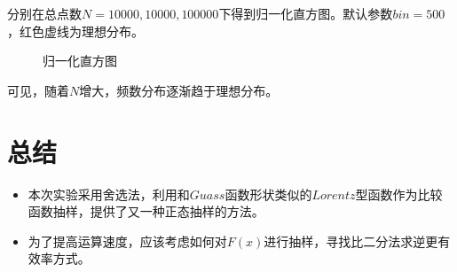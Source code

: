 \documentclass[UTF8]{ctexart}
\begin{document}
	\begin{flushleft}
		
	分别在总点数$N=10000,10000,100000$下得到归一化直方图。默认参数$bin=500$，红色虚线为理想分布。
	\end{flushleft}
	
		\begin{figure}[H]
			\centering  %
			\caption{归一化直方图}
		\end{figure}
\begin{flushleft}
		可见，随着$N$增大，频数分布逐渐趋于理想分布。
\end{flushleft}

	\clearpage
	\section{总结}
	\begin{itemize}
		\item 本次实验采用舍选法，利用和$Guass$函数形状类似的$Lorentz$型函数作为比较函数抽样，提供了又一种正态抽样的方法。
		\item 为了提高运算速度，应该考虑如何对$F(x)$进行抽样，寻找比二分法求逆更有效率方式。
	\end{itemize}
	\clearpage
\end{document}
